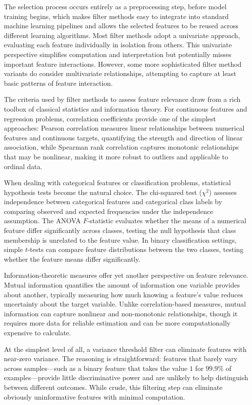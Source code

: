 The selection process occurs entirely as a preprocessing step, before model training begins, which makes filter methods easy to integrate into standard machine learning pipelines and allows the selected features to be reused across different learning algorithms. Most filter methods adopt a univariate approach, evaluating each feature individually in isolation from others. This univariate perspective simplifies computation and interpretation but potentially misses important feature interactions. However, some more sophisticated filter method variants do consider multivariate relationships, attempting to capture at least basic patterns of feature interaction.

The criteria used by filter methods to assess feature relevance draw from a rich toolbox of classical statistics and information theory. For continuous features and regression problems, correlation coefficients provide one of the simplest approaches: Pearson correlation measures linear relationships between numerical features and continuous targets, quantifying the strength and direction of linear association, while Spearman rank correlation captures monotonic relationships that may be nonlinear, making it more robust to outliers and applicable to ordinal data.

When dealing with categorical features or classification problems, statistical hypothesis tests become the natural choice. The chi-squared test ($\chi^2$) assesses independence between categorical features and categorical class labels by comparing observed and expected frequencies under the independence assumption. The ANOVA $F$-statistic evaluates whether the means of a numerical feature differ significantly across classes, testing the null hypothesis that class membership is unrelated to the feature value. In binary classification settings, simple $t$-tests can compare feature distributions between the two classes, testing whether the feature means differ significantly. 

Information-theoretic measures offer yet another perspective on feature relevance. Mutual information quantifies the amount of information one variable provides about another, typically measuring how much knowing a feature's value reduces uncertainty about the target variable. Unlike correlation-based measures, mutual information can capture nonlinear and non-monotonic relationships, though it requires more data for reliable estimation and can be more computationally expensive to calculate.

At the simplest level of all, a variance threshold filter can eliminate features with near-zero variance. The reasoning is straightforward: features that barely vary across samples—such as a binary feature that takes the value $1$ for $99.9\%$ of examples—provide little discriminative power and are unlikely to help distinguish between different outcomes. While crude, this filtering step can eliminate obviously uninformative features with minimal computation.

